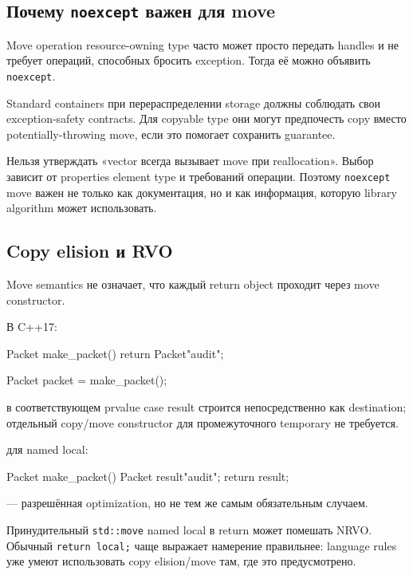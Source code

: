 \subsection{Почему \texttt{noexcept} важен для move}

Move operation resource-owning type часто может просто передать handles и не
требует операций, способных бросить exception. Тогда её можно объявить
\texttt{noexcept}.

Standard containers при перераспределении storage должны соблюдать свои
exception-safety contracts. Для copyable type они могут предпочесть copy вместо
potentially-throwing move, если это помогает сохранить guarantee.

\begin{performancebox}
Нельзя утверждать «vector всегда вызывает move при reallocation».
Выбор зависит от properties element type и требований операции. Поэтому
\texttt{noexcept} move важен не только как документация, но и как информация,
которую library algorithm может использовать.
\end{performancebox}

\subsection{Copy elision и RVO}

Move semantics не означает, что каждый return object проходит через move
constructor.

В C++17:

\begin{cppcode}
Packet make_packet() {
    return Packet{"audit"};
}

Packet packet = make_packet();
\end{cppcode}

в соответствующем prvalue case result строится непосредственно как destination;
отдельный copy/move constructor для промежуточного temporary не требуется.

 для named local:

\begin{cppcode}
Packet make_packet() {
    Packet result{"audit"};
    return result;
}
\end{cppcode}

--- разрешённая optimization, но не тем же самым обязательным случаем.

\begin{mistakebox}
Принудительный \texttt{std::move} named local в return может помешать NRVO.
Обычный \texttt{return local;} чаще выражает намерение правильнее: language
rules уже умеют использовать copy elision/move там, где это предусмотрено.
\end{mistakebox}

